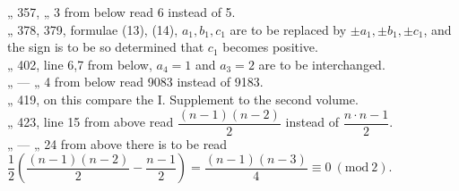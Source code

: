 \begin{flushleft}
„ 357, „ 3 from below read 6 instead of 5. \\
„ 378, 379, formulae (13), (14), $a_1, b_1, c_1$ are to be replaced by $\pm a_1, \pm b_1, \pm c_1$,
and the sign is to be so determined that $c_1$ becomes positive. \\
„ 402, line 6,7 from below, $a_4=1$ and $a_3=2$ are to be interchanged. \\
„ — „ 4 from below read 9083 instead of 9183. \\
„ 419, on this compare the I. Supplement to the second volume. \\
„ 423, line 15 from above read $\dfrac{(n-1)(n-2)}{2}$ instead of $\dfrac{n\cdot n-1}{2}$. \\
„ — „ 24 from above there is to be read
$\dfrac{1}{2}\left(\dfrac{(n-1)(n-2)}{2}-\dfrac{n-1}{2}\right)
=\dfrac{(n-1)(n-3)}{4}\equiv 0\ (\mathrm{mod}\ 2)$.
\end{flushleft}
